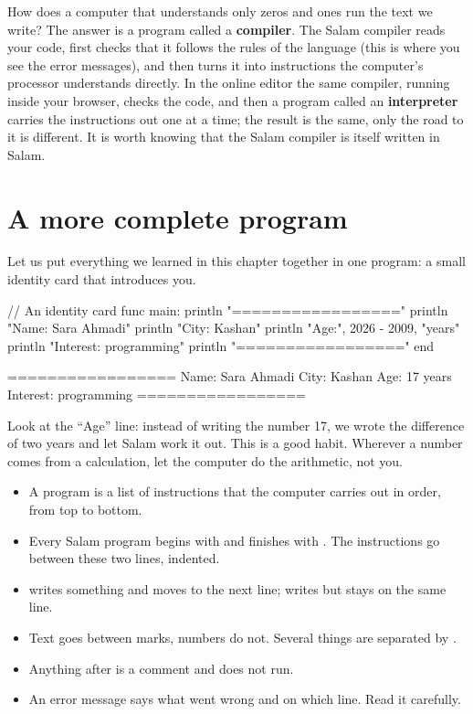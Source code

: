 \begin{deep}
How does a computer that understands only zeros and ones run the text we
write? The answer is a program called a \textbf{compiler}. The Salam compiler
reads your code, first checks that it follows the rules of the language
(this is where you see the error messages), and then turns it into
instructions the computer's processor understands directly. In the online
editor the same compiler, running inside your browser, checks the code, and
then a program called an \textbf{interpreter} carries the instructions out
one at a time; the result is the same, only the road to it is different.
It is worth knowing that the Salam compiler is itself written in Salam.
\end{deep}

\section{A more complete program}

Let us put everything we learned in this chapter together in one program: a
small identity card that introduces you.

\begin{salamcode}
// An identity card
func main:
    println "================="
    println "Name: Sara Ahmadi"
    println "City: Kashan"
    println "Age:", 2026 - 2009, "years"
    println "Interest: programming"
    println "================="
end
\end{salamcode}

\begin{salamout}
=================
Name: Sara Ahmadi
City: Kashan
Age: 17 years
Interest: programming
=================
\end{salamout}

Look at the ``Age'' line: instead of writing the number 17, we wrote the
difference of two years and let Salam work it out. This is a good habit.
Wherever a number comes from a calculation, let the computer do the
arithmetic, not you.

\begin{summary}
\begin{itemize}
  \item A program is a list of instructions that the computer carries out
        in order, from top to bottom.
  \item Every Salam program begins with  and finishes
        with . The instructions go between these two lines,
        indented.
  \item {} writes something and moves to the next line;
         writes but stays on the same line.
  \item Text goes between  marks, numbers do not. Several things
        are separated by \code{,}.
  \item Anything after \code{//} is a comment and does not run.
  \item An error message says what went wrong and on which line. Read it
        carefully.
\end{itemize}
\end{summary}

